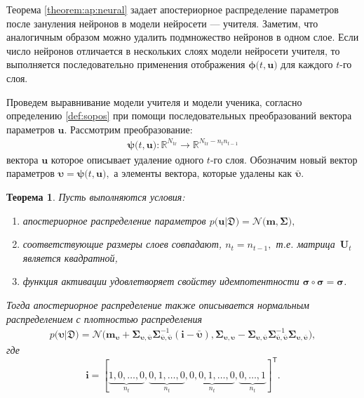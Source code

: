 \documentclass{dissert}
\newtheorem{theorem}{Теорема}
\begin{document}
Теорема \ref{theorem:ap:neural} задает апостериорное распределение параметров после зануления нейронов в модели нейросети --- учителя. Заметим, что аналогичным образом можно удалить подмножество нейронов в одном слое. Если число нейронов отличается в нескольких слоях модели нейросети учителя, то выполняется последовательно применения отображения $\bm{\phi}\bigr(t, \mathbf{u}\bigr)$ для каждого $t$-го слоя.

Проведем выравнивание модели учителя и модели ученика, согласно определению \ref{def:sopos} при помощи последовательных преобразований вектора параметров $\mathbf{u}$. Рассмотрим преобразование:
\[
\label{ch:3:eq:ap:4}
\begin{aligned}
\bm{\psi}\bigr(t, \mathbf{u}\bigr) : \mathbb{R}^{N_{\text{tr}}} \to \mathbb{R}^{N_{\text{tr}}-n_tn_{t-1}}
\end{aligned}
\]
вектора $\mathbf{u}$ которое описывает удаление одного $t$-го слоя.
Обозначим новый вектор параметров $\bm{\upsilon} = \bm{\psi}\bigr(t, \mathbf{u}\bigr),$ а элементы вектора, которые удалены как $\bar{\bm{\upsilon}}.$ 

\begin{theorem}
\label{theorem:ap:layer}
Пусть выполняются условия:
\begin{enumerate}[1)]
\item апостериорное распределение параметров $p\bigr(\mathbf{u}|\mathfrak{D}\bigr) = \mathcal{N}\bigr(\mathbf{m}, \bm{\Sigma}\bigr),$
\item соответствующие размеры слоев совпадают, $n_t=n_{t-1},$ т.е. матрица~$\mathbf{U}_t$ является квадратной,
\item функция активации удовлетворяет свойству идемпотентности $\bm{\sigma} \circ \bm{\sigma} = \bm{\sigma}$.
\end{enumerate}
Тогда апостериорное распределение также описывается нормальным распределением с плотностью распределения
\[
\label{ch:3:eq:ap:5}
\begin{aligned}
p\bigr(\bm{\upsilon}|\mathfrak{D}\bigr) = \mathcal{N}\bigr(\mathbf{m}_{\bm{\upsilon}}+\bm{\Sigma}_{\bm{\upsilon},\bar{\bm{\upsilon}}} \bm{\Sigma}_{\bar{\bm{\upsilon}},\bar{\bm{\upsilon}}}^{-1} \left(\mathbf{i} - \bar{\bm{\upsilon}}\right), \bm{\Sigma}_{\bm{\upsilon},\bm{\upsilon}} - \bm{\Sigma}_{\bm{\upsilon},\bar{\bm{\upsilon}}}\bm{\Sigma}_{\bar{\bm{\upsilon}},\bar{\bm{\upsilon}}}^{-1}\bm{\Sigma}_{\bm{\upsilon},\bar{\bm{\upsilon}}}\bigr),
\end{aligned}
\]
где
\[
\mathbf{i}=[\underbrace{1, 0, \ldots, 0}_{n_t}, \underbrace{0, 1, \ldots, 0}_{n_t}, \underbrace{0, 0, 1, \ldots, 0}_{n_t}, \underbrace{0, \ldots, 1}_{n_t}]^{\mathsf{T}}.
\]
\end{theorem}
\end{document}
